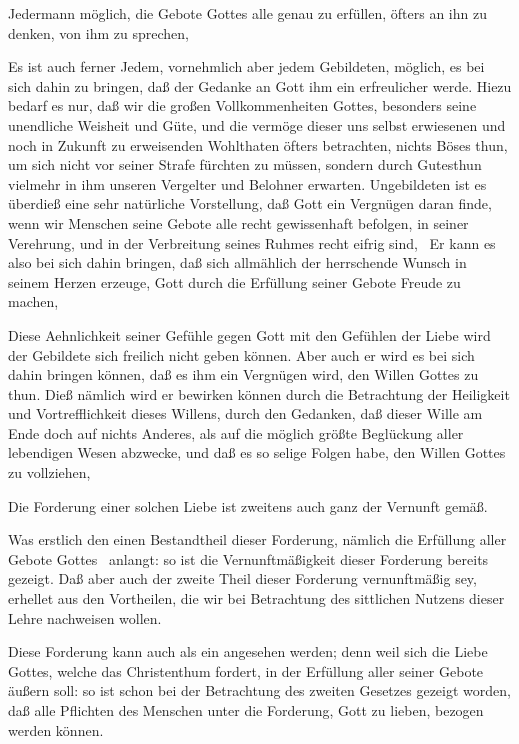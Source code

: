 \begin{aufza}
\begin{aufzb}
\begin{aufzc}
\item Jedermann möglich, die Gebote Gottes alle genau zu erfüllen, öfters an ihn zu denken, von ihm zu sprechen, \usw\
\item Es ist auch ferner Jedem, vornehmlich aber jedem Gebildeten, möglich, es bei sich dahin zu bringen, daß der Gedanke an Gott ihm ein erfreulicher werde. Hiezu bedarf es nur, daß wir die großen Vollkommenheiten Gottes, besonders seine unendliche Weisheit und Güte, und die vermöge dieser uns selbst erwiesenen und noch in Zukunft zu erweisenden Wohlthaten öfters betrachten, nichts Böses thun, um sich nicht vor seiner Strafe fürchten zu müssen, sondern durch Gutesthun vielmehr in ihm unseren Vergelter und Belohner erwarten. Ungebildeten ist es überdieß eine sehr natürliche Vorstellung, daß Gott ein Vergnügen daran finde, wenn wir Menschen seine Gebote alle recht gewissenhaft befolgen, in seiner Verehrung, und in der Verbreitung seines Ruhmes recht eifrig sind, \usw\ Er kann es also bei sich dahin bringen, daß sich allmählich der herrschende Wunsch in seinem Herzen erzeuge, Gott durch die Erfüllung seiner Gebote Freude zu machen, \usw\
\end{aufzc}
Diese Aehnlichkeit seiner Gefühle gegen Gott mit den Gefühlen der Liebe wird der Gebildete sich freilich nicht geben können. Aber auch er wird es bei sich dahin bringen können, daß es ihm ein Vergnügen wird, den Willen Gottes zu thun. Dieß nämlich wird er bewirken können durch die Betrachtung der Heiligkeit und Vortrefflichkeit dieses Willens, durch den Gedanken, daß dieser Wille am Ende doch auf nichts Anderes, als auf die möglich größte Beglückung aller lebendigen Wesen abzwecke, und daß es so selige Folgen habe, den Willen Gottes zu vollziehen, \usw\par
Die Forderung einer solchen Liebe ist zweitens auch ganz der Vernunft gemäß.\par
Was erstlich den einen Bestandtheil dieser Forderung, nämlich die Erfüllung aller Gebote Gottes \usw\ anlangt: so ist die Vernunftmäßigkeit dieser Forderung bereits gezeigt. Daß aber auch der zweite Theil dieser Forderung vernunft\RWSeitenw{226}mäßig sey, erhellet aus den Vortheilen, die wir bei Betrachtung des sittlichen Nutzens dieser Lehre nachweisen wollen.
\item Diese Forderung kann auch als ein \RWbet{allgemeines Sittengesetz} angesehen werden; denn weil sich die Liebe Gottes, welche das Christenthum fordert, in der Erfüllung aller seiner Gebote äußern soll: so ist schon bei der Betrachtung des zweiten Gesetzes gezeigt worden, daß alle Pflichten des Menschen unter die Forderung, Gott zu lieben, bezogen werden können.

\end{aufzb}
\end{aufza}
